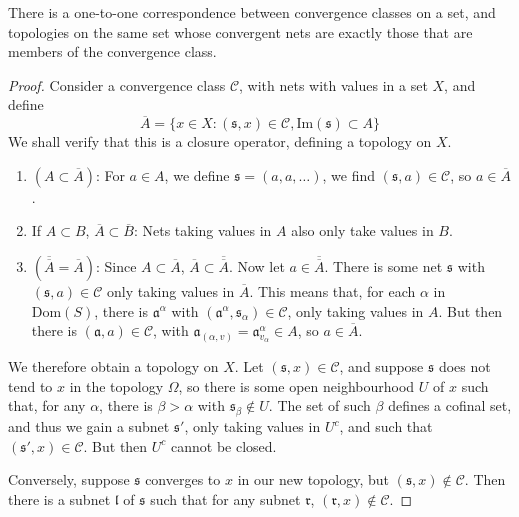\begin{theorem}
    There is a one-to-one correspondence between convergence classes on a set, and topologies on the same set whose convergent nets are exactly those that are members of the convergence class.
\end{theorem}
\begin{proof}
    Consider a convergence class $\mathcal{C}$, with nets with values in a set $X$, and define
    \[ \overline{A} = \{ x \in X : (\mathfrak{s}, x) \in \mathcal{C}, \text{Im}(\mathfrak{s}) \subset A \} \]
    We shall verify that this is a closure operator, defining a topology on $X$.
    \begin{enumerate}
        \item $(A \subset \overline{A})$: For $a \in A$, we define $\mathfrak{s} = (a,a,\dots)$, we find $(\mathfrak{s},a) \in \mathcal{C}$, so $a \in \overline{A}$.
        \item If $A \subset B$, $\overline{A} \subset \overline{B}$: Nets taking values in $A$ also only take values in $B$.
        \item $(\overline{\overline{A}} = \overline{A})$: Since $A \subset \overline{A}$, $\overline{A} \subset \overline{\overline{A}}$. Now let $a \in \overline{\overline{A}}$. There is some net $\mathfrak{s}$ with $(\mathfrak{s},a) \in \mathcal{C}$ only taking values in $\overline{A}$. This means that, for each $\alpha$ in $\text{Dom}(S)$, there is $\mathfrak{a}^\alpha$ with $(\mathfrak{a}^\alpha, \mathfrak{s}_\alpha) \in \mathcal{C}$, only taking values in $A$. But then there is $(\mathfrak{a}, a) \in \mathcal{C}$, with $\mathfrak{a}_{(\alpha, v)} = \mathfrak{a}^\alpha_{v_\alpha} \in A$, so $a \in \overline{A}$.
    \end{enumerate}
    We therefore obtain a topology on $X$. Let $(\mathfrak{s},x) \in \mathcal{C}$, and suppose $\mathfrak{s}$ does not tend to $x$ in the topology $\Omega$, so there is some open neighbourhood $U$ of $x$ such that, for any $\alpha$, there is $\beta > \alpha$ with $\mathfrak{s}_\beta \not \in U$. The set of such $\beta$ defines a cofinal set, and thus we gain a subnet $\mathfrak{s}'$, only taking values in $U^c$, and such that $(\mathfrak{s}',x) \in \mathcal{C}$. But then $U^c$ cannot be closed.

    Conversely, suppose $\mathfrak{s}$ converges to $x$ in our new topology, but $(\mathfrak{s},x) \not \in \mathcal{C}$. Then there is a subnet $\mathfrak{l}$ of $\mathfrak{s}$ such that for any subnet $\mathfrak{r}$, $(\mathfrak{r}, x) \not \in \mathcal{C}$.



\end{proof}
